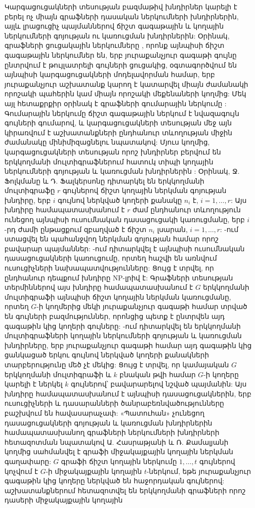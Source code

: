 Կարգացուցակների տեսության բազմաթիվ խնդիրներ կարելի է բերել ոչ միայն գրաֆների դասական ներկումների խնդիրներին, այլև լրացուցիչ պայմաններով ճիշտ գագաթային և կողային ներկումների գոյության ու կառուցման խնդիրներին: Օրինակ, գրաֆների ցուցակային ներկումները \cite{ErdosRubinTaylor,VizingVertex}, որոնք այնպիսի ճիշտ գագաթային ներկումներ են, երբ յուրաքանչյուր գագաթի գույնը ընտրվում է թույլատրելի գույների ցուցակից, օգտագործվում են այնպիսի կարգացուցակների մոդելավորման համար, երբ յուրաքանչյուր աշխատանք կարող է կատարվել միայն ժամանակի որոշակի պահերին կամ միայն որոշակի մեքենաների կողմից: Մեկ այլ հետաքրքիր օրինակ է գրաֆների գումարային ներկումը \cite{KubickaSum,SupowitSum}: Գումարային ներկումը ճիշտ գագաթային ներկում է նվազագույն գույների գումարով, և կարգացուցակների տեսության մեջ այն կիրառվում է աշխատանքների ընդհանուր տևողության միջին ժամանակը մինիմիզացնելու նպատակով: Մյուս կողմից, կարգացուցակների տեսության որոշ խնդիրներ բերվում են երկկողմանի մուլտիգրաֆներում հատուկ տիպի կողային ներկումների գոյության և կառուցման խնդիրներին \cite{EvenItaiShamir,FolkmanFulkerson,DeWerra1971Balanced,DeWerraSolot1991}: Օրինակ, Ջ. Ֆոլկմանը և Դ. Ֆալկերսոնը \cite{FolkmanFulkerson} դիտարկել են երկկողմանի մուլտիգրաֆը $r$ գույներով ճիշտ կողային ներկման գոյության խնդիրը, երբ $i$ գույնով ներկված կողերի քանակը $n_i$ է, $i=1,\ldots,r$: Այս խնդիրը համապատասխանում է $r$ ժամ ընդհանուր տևողություն ունեցող այնպիսի ուսումնական դասացուցակի կառուցմանը, երբ $i$-րդ ժամի ընթացքում զբաղված է ճիշտ $n_i$ լսարան, $i=1,\ldots,r$: \cite{Asratian2000,DeWerra1971,DulmageMendelsohn}-ում ստացվել են պահանջվող ներկման գոյության համար որոշ բավարար պայմաններ: \cite{EvenItaiShamir}-ում դիտարկվել է այնպիսի ուսումնական դասացուցակների կառուցումը, որտեղ հաշվի են առնվում ուսուցիչների նախապատվությունները: Ցույց է տրվել, որ ընդհանուր դեպքում խնդիրը NP-լրիվ է: Գրաֆների տեսության տերմիններով այս խնդիրը համապատասխանում է $G$ երկկողմանի մուլտիգրաֆի այնպիսի ճիշտ կողային ներկման կառուցմանը, որտեղ $G$-ի կողմերից մեկի յուրաքանչյուր գագաթի համար տրված են գույների բազմություններ, որոնցից պետք է ընտրվեն այդ գագաթին կից կողերի գույները: \cite{DeWerra1971Balanced}-ում դիտարկվել են երկկողմանի մուլտիգրաֆների կողային ներկումների գոյության և կառուցման խնդիրները, երբ յուրաքանչյուր գագաթի համար այդ գագաթին կից ցանկացած երկու գույնով ներկված կողերի քանակների տարբերությունը մեծ չէ մեկից: Ցույց է տրվել, որ կամայական $G$ երկկողմանի մուլտիգրաֆի և $k$ բնական թվի համար $G$-ի կողերը կարելի է ներկել $k$ գույներով՝ բավարարելով նշված պայմանին: Այս խնդիրը համապատասխանում է այնպիսի դասացուցակներին, երբ ուսուցիչների և դասարանների ծանրաբեռնվածությունները բաշխվում են հավասարաչափ: «Պատուհան» չունեցող դասացուցակների գոյության և կառուցման խնդիրներին համապատասխանող գրաֆների ներկումների խնդիրների հետազոտման նպատակով Ա. Հասրաթյանի և Ռ. Քամալյանի կողմից սահմանվել է գրաֆի միջակայքային կողային ներկման \cite{AsratianKamalian1987} գաղափարը: $G$ գրաֆի ճիշտ կողային ներկումը $1,\ldots,t$ գույներով կոչվում է $G$-ի միջակայքային կողային $t$-ներկում, եթե յուրաքանչյուր գագաթին կից կողերը ներկված են հաջորդական գույներով: \cite{AsratianDenleyHaggvist1998,GiaroKubale1997,GiaroKubale2004,HansonLotenToft1998,Petrosyan2010,PetrosyanKarapetyan2007,PetrosyanKhachatrianTananyan2013,Kamalian1989,Kamalian1990,KamalianMirumyan1997} աշխատանքներում հետազոտվել են երկկողմանի գրաֆների որոշ դասերի միջակայքային կողային 